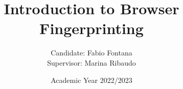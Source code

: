 \documentclass{beamer}
\title{Introduction to Browser Fingerprinting}
\author[Fabio Fontana]{Candidate: Fabio Fontana \\ {\small Supervisor: Marina Ribaudo}}
\institute{University of Genoa}
\date{Academic Year 2022/2023}
\begin{document}
\frame{\titlepage}
\end{document}
